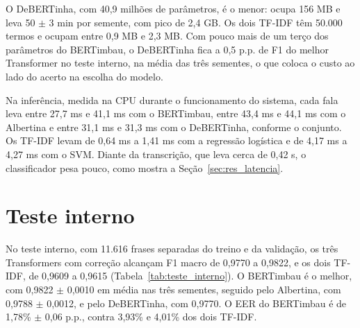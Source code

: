 \documentclass[
    12pt,                %
    openright,           %
    oneside,             %
    a4paper,             %
    english,             %
    brazil               %
]{abntex2}
\begin{document}
O DeBERTinha, com 40,9 milhões de parâmetros, é o menor: ocupa 156 MB e leva 50 $\pm$ 3 min por semente, com pico de 2,4 GB. Os dois TF-IDF têm 50.000 termos e ocupam entre 0,9 MB e 2,3 MB. Com pouco mais de um terço dos parâmetros do BERTimbau, o DeBERTinha fica a 0,5 p.p. de F1 do melhor Transformer no teste interno, na média das três sementes, o que coloca o custo ao lado do acerto na escolha do modelo.

Na inferência, medida na CPU durante o funcionamento do sistema, cada fala leva entre 27,7 ms e 41,1 ms com o BERTimbau, entre 43,4 ms e 44,1 ms com o Albertina e entre 31,1 ms e 31,3 ms com o DeBERTinha, conforme o conjunto. Os TF-IDF levam de 0,64 ms a 1,41 ms com a regressão logística e de 4,17 ms a 4,27 ms com o SVM. Diante da transcrição, que leva cerca de 0,42 s, o classificador pesa pouco, como mostra a Seção~\ref{sec:res_latencia}.


\section{Teste interno}
\label{sec:res_teste_interno}

No teste interno, com 11.616 frases separadas do treino e da validação, os três Transformers com correção alcançam F1 macro de 0,9770 a 0,9822, e os dois TF-IDF, de 0,9609 a 0,9615 (Tabela~\ref{tab:teste_interno}). O BERTimbau é o melhor, com 0,9822 $\pm$ 0,0010 em média nas três sementes, seguido pelo Albertina, com 0,9788 $\pm$ 0,0012, e pelo DeBERTinha, com 0,9770. O EER do BERTimbau é de 1,78\% $\pm$ 0,06 p.p., contra 3,93\% e 4,01\% dos dois TF-IDF.
\end{document}
